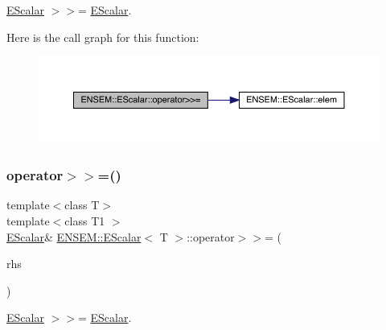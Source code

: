 \mbox{\hyperlink{classENSEM_1_1EScalar}{E\+Scalar}} $>$$>$= \mbox{\hyperlink{classENSEM_1_1EScalar}{E\+Scalar}}. 

Here is the call graph for this function\+:
\nopagebreak
\begin{figure}[H]
\begin{center}
\leavevmode
\includegraphics[width=350pt]{d0/d82/classENSEM_1_1EScalar_a0e520529327800038c3775d195819b6f_cgraph}
\end{center}
\end{figure}
\mbox{\label{classENSEM_1_1EScalar_a0e520529327800038c3775d195819b6f}} 
\subsubsection{\texorpdfstring{operator$>$$>$=()}{operator>>=()}\hspace{0.1cm}{\footnotesize\ttfamily [2/3]}}
{\footnotesize\ttfamily template$<$class T$>$ \\
template$<$class T1 $>$ \\
\mbox{\hyperlink{classENSEM_1_1EScalar}{E\+Scalar}}\& \mbox{\hyperlink{classENSEM_1_1EScalar}{E\+N\+S\+E\+M\+::\+E\+Scalar}}$<$ T $>$\+::operator$>$$>$= (\begin{DoxyParamCaption}\item[{const \mbox{\hyperlink{classENSEM_1_1EScalar}{E\+Scalar}}$<$ T1 $>$ \&}]{rhs }\end{DoxyParamCaption})\hspace{0.3cm}{\ttfamily [inline]}}



\mbox{\hyperlink{classENSEM_1_1EScalar}{E\+Scalar}} $>$$>$= \mbox{\hyperlink{classENSEM_1_1EScalar}{E\+Scalar}}. 

